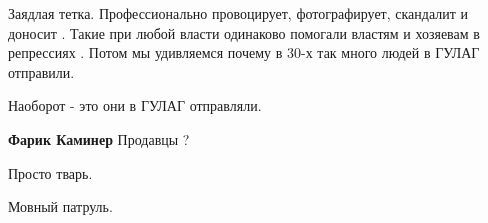 \begin{itemize}
Заядлая тетка. Профессионально провоцирует, фотографирует, скандалит и доносит
. Такие при любой власти одинаково помогали властям и хозяевам в репрессиях .
Потом мы удивляемся почему в 30-х так много людей в ГУЛАГ отправили.

\begin{itemize}
 
Наоборот - это они в ГУЛАГ отправляли.

 
\textbf{Фарик Каминер} Продавцы ?
\end{itemize}

 
Просто тварь.

 
Мовный патруль. 🤬

\end{itemize}

